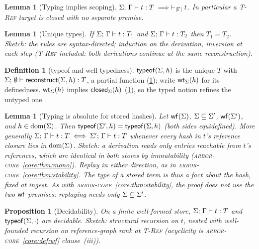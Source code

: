 \documentclass[11pt]{article}
\theoremstyle{definition}
\newtheorem{definition}{Definition}[section]
\theoremstyle{plain}
\newtheorem{lemma}[theorem]{Lemma}
\newtheorem{proposition}[theorem]{Proposition}
\theoremstyle{remark}
\newcommand{\arborcore}{\textsc{arbor-core}}
\newcommand{\coreref}[1]{\arborcore~\cref{core:#1}}
\begin{document}
\begin{lemma}[Typing implies scoping]\label{lem:ty-scope}
$\Sigma;\,\Gamma \vdash t : T \implies \vdash_{|\Gamma|} t$. In particular a
\textsc{T-Ref} target is closed with no separate premise.
\end{lemma}

\begin{lemma}[Unique types]\label{lem:ty-unique}
If $\Sigma;\,\Gamma \vdash t : T_1$ and $\Sigma;\,\Gamma \vdash t : T_2$ then $T_1 = T_2$.
\emph{Sketch:} the rules are syntax-directed; induction on the derivation, inversion at
each step (\textsc{T-Ref} included: both derivations continue at the same reconstruction).
\end{lemma}

\begin{definition}[typeof and well-typedness]\label{def:typeof}
$\mathsf{typeof}(\Sigma,h)$ is the unique $T$ with
$\Sigma;\,\emptyset \vdash \mathsf{reconstruct}(\Sigma,h) : T$, a partial function
(\cref{lem:ty-unique}); write $\mathsf{wt}_{\Sigma}(h)$ for its definedness. $\mathsf{wt}_{\Sigma}(h)$
implies $\mathsf{closed}_{\Sigma}(h)$ (\cref{lem:ty-scope}), so the typed notion refines the untyped
one.
\end{definition}

\begin{lemma}[Typing is absolute for stored hashes]\label{lem:ty-stable}
Let $\mathsf{wf}(\Sigma)$, $\Sigma \subseteq \Sigma'$, $\mathsf{wf}(\Sigma')$, and $h \in \operatorname{dom}(\Sigma)$.
Then $\mathsf{typeof}(\Sigma',h) = \mathsf{typeof}(\Sigma,h)$ (both sides equidefined). More generally
$\Sigma;\,\Gamma \vdash t : T \iff \Sigma';\,\Gamma \vdash t : T$ whenever every hash in
$t$'s reference closure lies in $\operatorname{dom}(\Sigma)$.
\emph{Sketch:} a derivation reads only entries reachable from $t$'s references, which are
identical in both stores by immutability (\coreref{thm:mono}). Replay in either direction, as
in \coreref{thm:stability}. The type of a stored term is thus a fact about the hash, fixed at
ingest. As with \coreref{thm:stability}, the proof does not use the two $\mathsf{wf}$ premises:
replaying needs only $\Sigma \subseteq \Sigma'$.
\end{lemma}

\begin{proposition}[Decidability]\label{prop:ty-dec}
On a finite well-formed store, $\Sigma;\,\Gamma \vdash t : T$ and $\mathsf{typeof}(\Sigma,\cdot)$
are decidable. \emph{Sketch:} structural recursion on $t$, nested with well-founded
recursion on reference-graph rank at \textsc{T-Ref} (acyclicity is \coreref{def:wf}
clause~(iii)).
\end{proposition}
\end{document}
